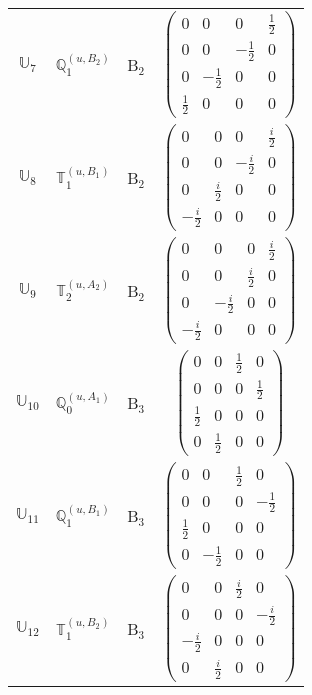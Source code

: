 \documentclass[fleqn,10pt,landscape]{article}
\begin{document}
\begin{itemize}
\begin{center}
\begin{longtable}{c|c|c|c}
$ \mathbb{U}_{7} $ & $\mathbb{Q}_{1}^{(u,B_{2})}$ & B$_{2}$ & $\begin{pmatrix} 0 & 0 & 0 & \frac{1}{2} \\ 0 & 0 & - \frac{1}{2} & 0 \\ 0 & - \frac{1}{2} & 0 & 0 \\ \frac{1}{2} & 0 & 0 & 0 \end{pmatrix}$ \\
$ \mathbb{U}_{8} $ & $\mathbb{T}_{1}^{(u,B_{1})}$ & B$_{2}$ & $\begin{pmatrix} 0 & 0 & 0 & \frac{i}{2} \\ 0 & 0 & - \frac{i}{2} & 0 \\ 0 & \frac{i}{2} & 0 & 0 \\ - \frac{i}{2} & 0 & 0 & 0 \end{pmatrix}$ \\
$ \mathbb{U}_{9} $ & $\mathbb{T}_{2}^{(u,A_{2})}$ & B$_{2}$ & $\begin{pmatrix} 0 & 0 & 0 & \frac{i}{2} \\ 0 & 0 & \frac{i}{2} & 0 \\ 0 & - \frac{i}{2} & 0 & 0 \\ - \frac{i}{2} & 0 & 0 & 0 \end{pmatrix}$ \\ \hline
$ \mathbb{U}_{10} $ & $\mathbb{Q}_{0}^{(u,A_{1})}$ & B$_{3}$ & $\begin{pmatrix} 0 & 0 & \frac{1}{2} & 0 \\ 0 & 0 & 0 & \frac{1}{2} \\ \frac{1}{2} & 0 & 0 & 0 \\ 0 & \frac{1}{2} & 0 & 0 \end{pmatrix}$ \\
$ \mathbb{U}_{11} $ & $\mathbb{Q}_{1}^{(u,B_{1})}$ & B$_{3}$ & $\begin{pmatrix} 0 & 0 & \frac{1}{2} & 0 \\ 0 & 0 & 0 & - \frac{1}{2} \\ \frac{1}{2} & 0 & 0 & 0 \\ 0 & - \frac{1}{2} & 0 & 0 \end{pmatrix}$ \\
$ \mathbb{U}_{12} $ & $\mathbb{T}_{1}^{(u,B_{2})}$ & B$_{3}$ & $\begin{pmatrix} 0 & 0 & \frac{i}{2} & 0 \\ 0 & 0 & 0 & - \frac{i}{2} \\ - \frac{i}{2} & 0 & 0 & 0 \\ 0 & \frac{i}{2} & 0 & 0 \end{pmatrix}$ \\

\end{longtable}
\end{center}
\end{itemize}
\end{document}
